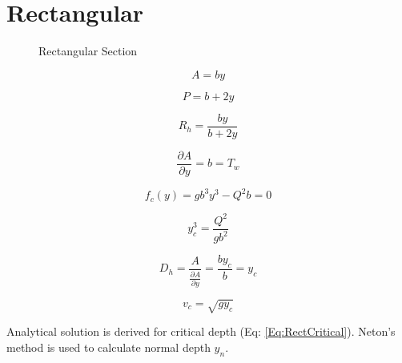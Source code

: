 
\section{Rectangular}

\begin{figure}[h]
\centering
{}
\caption{Rectangular Section}
\end{figure}

\begin{equation}
A = by
\end{equation}

\begin{equation}
P = b + 2y
\end{equation}

\begin{equation}
R_h = \frac{by}{b+2y}
\end{equation}

\begin{equation}
\frac{\partial A}{\partial y} = b = T_w
\end{equation}

\begin{equation}  
f_c(y)= gb^3y^3 -Q^2b= 0
\end{equation}

\begin{equation}  
y_c^3 = \frac{Q^2}{gb^2}
\label{Eq:RectCritical}
\end{equation}

\begin{equation}  
D_h = \frac{A}{\frac{\partial A}{\partial y}} = \frac{by_c}{b} = y_c
\end{equation}

\begin{equation}  
v_c = \sqrt{g y_c}
\end{equation}

\noindent Analytical solution is derived for critical depth (Eq: \ref{Eq:RectCritical}). Neton's method is used to calculate normal depth $y_n$.